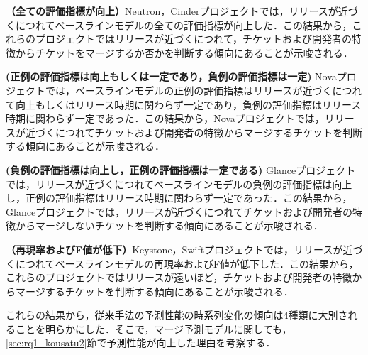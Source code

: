 \documentclass[submit]{ipsj}
\begin{document}
\textbf{（全ての評価指標が向上）}Neutron，Cinderプロジェクトでは，リリースが近づくにつれてベースラインモデルの全ての評価指標が向上した．この結果から，これらのプロジェクトではリリースが近づくにつれて，チケットおよび開発者の特徴からチケットをマージするか否かを判断する傾向にあることが示唆される．

\textbf{ (正例の評価指標は向上もしくは一定であり，負例の評価指標は一定) }Novaプロジェクトでは，ベースラインモデルの正例の評価指標はリリースが近づくにつれて向上もしくはリリース時期に関わらず一定であり，負例の評価指標はリリース時期に関わらず一定であった．この結果から，Novaプロジェクトでは，リリースが近づくにつれてチケットおよび開発者の特徴からマージするチケットを判断する傾向にあることが示唆される．

\textbf{ (負例の評価指標は向上し，正例の評価指標は一定である) }Glanceプロジェクトでは，リリースが近づくにつれてベースラインモデルの負例の評価指標は向上し，正例の評価指標はリリース時期に関わらず一定であった．この結果から，Glanceプロジェクトでは，リリースが近づくにつれてチケットおよび開発者の特徴からマージしないチケットを判断する傾向にあることが示唆される．

\textbf{（再現率およびF値が低下）}Keystone，Swiftプロジェクトでは，リリースが近づくにつれてベースラインモデルの再現率およびF値が低下した．この結果から，これらのプロジェクトではリリースが遠いほど，チケットおよび開発者の特徴からマージするチケットを判断する傾向にあることが示唆される．

これらの結果から，従来手法の予測性能の時系列変化の傾向は4種類に大別されることを明らかにした．そこで，マージ予測モデルに関しても，\ref{sec:rq1_kousatu2}節で予測性能が向上した理由を考察する．

\begin{table}[t]
\caption{各プロジェクトのマージ予測モデルにおける評価指標の回帰係数の分類}
\label{table:merge_seino_jikeiretsu}
\centering
\vspace{0.5zh}
\end{table}
\end{document}
